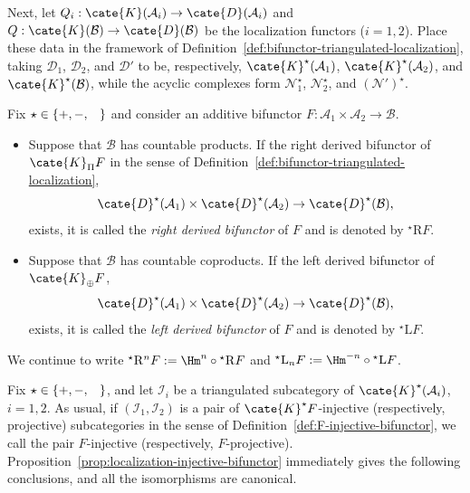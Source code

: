 Next, let $Q_i:\cate{K}(\mathcal{A}_i)\to\cate{D}(\mathcal{A}_i)$ and
$Q:\cate{K}(\mathcal{B})\to\cate{D}(\mathcal{B})$ be the localization
functors ($i=1,2$). Place these data in the framework of
Definition~\ref{def:bifunctor-triangulated-localization}, taking
$\mathcal{D}_1$, $\mathcal{D}_2$, and $\mathcal{D}'$ to be, respectively,
$\cate{K}^\star(\mathcal{A}_1)$, $\cate{K}^\star(\mathcal{A}_2)$, and
$\cate{K}^\star(\mathcal{B})$, while the acyclic complexes form
$\mathcal{N}_1^\star$, $\mathcal{N}_2^\star$, and
$(\mathcal{N}')^\star$.

\begin{definition}\label{def:derived-bifunctor}
	 
	Fix $\star\in\{+,-,\hspace{0.8em}\}$ and consider an additive bifunctor
	$F:\mathcal{A}_1\times\mathcal{A}_2\to\mathcal{B}$.
	\begin{itemize}
		\item Suppose that $\mathcal{B}$ has countable products. If the right
		derived bifunctor of $\cate{K}_{\Pi}F$ in the sense of
		Definition~\ref{def:bifunctor-triangulated-localization},
		\[\cate{D}^\star(\mathcal{A}_1)\times\cate{D}^\star(\mathcal{A}_2)
		\to\cate{D}^\star(\mathcal{B}),\]
		exists, it is called the \emph{right derived bifunctor} of $F$ and is
		denoted by ${}^\star\mathrm{R}F$.
		\item Suppose that $\mathcal{B}$ has countable coproducts. If the left
		derived bifunctor of $\cate{K}_{\oplus}F$,
		\[\cate{D}^\star(\mathcal{A}_1)\times\cate{D}^\star(\mathcal{A}_2)
		\to\cate{D}^\star(\mathcal{B}),\]
		exists, it is called the \emph{left derived bifunctor} of $F$ and is
		denoted by ${}^\star\mathrm{L}F$.
	\end{itemize}
	We continue to write
	${}^\star\mathrm{R}^nF:=\Hm^n\circ{}^\star\mathrm{R}F$ and
	${}^\star\mathrm{L}_nF:=\Hm^{-n}\circ{}^\star\mathrm{L}F$.
\end{definition}

Fix $\star\in\{+,-,\hspace{0.8em}\}$, and let $\mathcal{I}_i$ be a
triangulated subcategory of $\cate{K}^\star(\mathcal{A}_i)$, $i=1,2$. As
usual, if $(\mathcal{I}_1,\mathcal{I}_2)$ is a pair of
$\cate{K}^\star F$-injective (respectively, projective) subcategories in the
sense of Definition~\ref{def:F-injective-bifunctor}, we call the pair
$F$-injective (respectively, $F$-projective). Proposition~\ref{prop:localization-injective-bifunctor}
immediately gives the following conclusions, and all the isomorphisms are
canonical.
 

